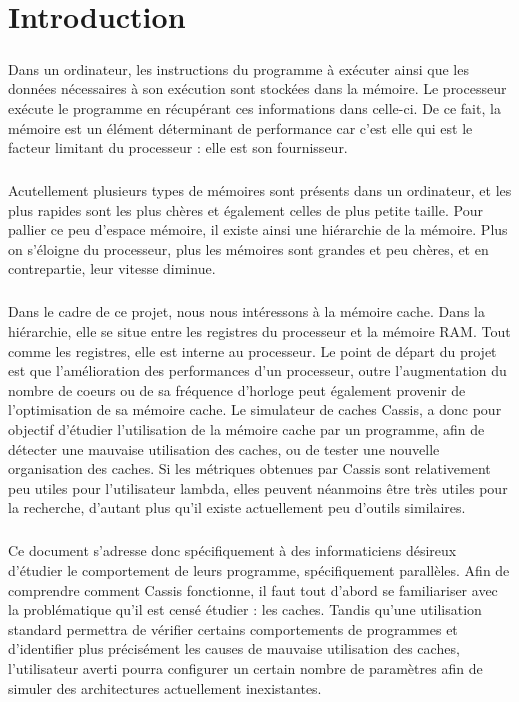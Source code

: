 \chapter*{Introduction}

\paragraph{}
Dans un ordinateur, les instructions du programme à exécuter ainsi que les données nécessaires
à son exécution sont stockées dans la mémoire. Le processeur exécute le programme en récupérant ces informations dans celle-ci. De ce fait, la mémoire est un élément déterminant de performance car c'est elle qui est le facteur limitant du processeur : elle est son fournisseur.

\paragraph{}
Acutellement plusieurs types de mémoires sont présents dans un ordinateur, et les plus rapides sont les plus chères et également celles de plus petite taille.
Pour pallier ce peu d'espace mémoire, il existe ainsi une hiérarchie de la mémoire. Plus on s'éloigne du processeur, plus les mémoires sont grandes et peu chères, et en contrepartie, leur vitesse diminue. 

\paragraph{}
Dans le cadre de ce projet, nous nous intéressons à la mémoire cache. Dans la hiérarchie, elle se situe entre les registres du processeur et la mémoire RAM. Tout comme les registres, elle est interne au processeur.
Le point de départ du projet est que l'amélioration des performances d'un processeur, outre l'augmentation du nombre de coeurs ou de sa fréquence d'horloge peut également provenir de l'optimisation de sa mémoire cache. Le simulateur de caches \textsf{Cassis}, a donc pour objectif d'étudier l'utilisation de la mémoire cache par un programme, afin de détecter une mauvaise utilisation des caches, ou de tester une nouvelle organisation des caches. Si les métriques obtenues par \textsf{Cassis} sont relativement peu utiles pour l'utilisateur lambda, elles peuvent néanmoins être très utiles pour la recherche, d'autant plus qu'il existe actuellement peu d'outils similaires.

\paragraph{}
Ce document s'adresse donc spécifiquement à des informaticiens désireux d'étudier le comportement de leurs programme, spécifiquement parallèles. Afin de comprendre comment \textsf{Cassis} fonctionne, il faut tout d'abord se familiariser avec la problématique qu'il est censé étudier : les caches. Tandis qu'une utilisation standard permettra de vérifier certains comportements de programmes et d'identifier plus précisément les causes de mauvaise utilisation des caches, l'utilisateur averti pourra configurer un certain nombre de paramètres afin de simuler des architectures actuellement inexistantes.
